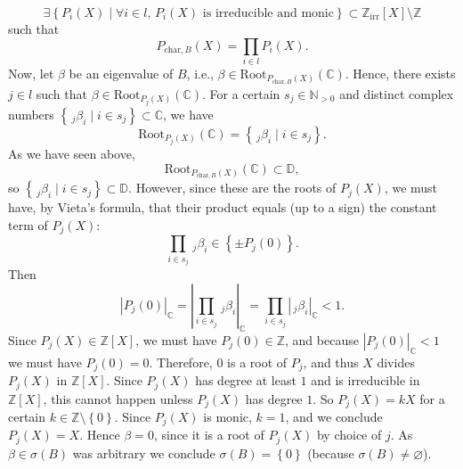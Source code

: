 \begin{solution}
    \[
        \exists \left\{P_i\left(X\right) \mid \forall i \in l,\, P_i\left(X\right) \text{ is irreducible and monic} \right\} \subset \mathbb{Z}_{\text{irr}}\left[X\right] \setminus \mathbb{Z}
    \]
    such that
    \[
        P_{\text{char},B}\left(X\right) = \prod_{i \in l} P_i\left(X\right).
    \]
    Now, let \( \beta \) be an eigenvalue of \( B \), i.e., \( \beta \in \mathrm{Root}_{P_{\text{char},B}\left(X\right)}\left(\mathbb{C}\right) \). Hence, there exists \( j \in l \) such that \( \beta \in \mathrm{Root}_{P_j\left(X\right)}\left(\mathbb{C}\right) \). For a certain \( s_j \in \mathbb{N}_{>0} \) and distinct complex numbers \( \left\{\,_{j}\beta_i \mid i \in s_j \right\} \subset \mathbb{C} \), we have
    \[
        \mathrm{Root}_{P_j\left(X\right)}\left(\mathbb{C}\right) = \left\{\,_{j}\beta_i \mid i \in s_j \right\}.
    \]
    As we have seen above,
    \[
        \mathrm{Root}_{P_{\text{char},B}\left(X\right)}\left(\mathbb{C}\right) \subset \mathbb{D},
    \]
    so \( \left\{\,_{j}\beta_i \mid i \in s_j \right\} \subset \mathbb{D} \). However, since these are the roots of \( P_j\left(X\right) \), we must have, by Vieta's formula, that their product equals (up to a sign) the constant term of \( P_j\left(X\right) \):
    \[
        \prod_{i\in s_j} \,_{j}\beta_i \in\left\{\pm P_j\left(0\right)\right\}.
    \]
    Then
    \[
        \left|P_j\left(0\right)\right|_{\mathbb{C}} = \left| \prod_{i\in s_j} \,_{j}\beta_i \right|_{\mathbb{C}} = \prod_{i\in s_j} \left| \,_{j}\beta_i \right|_{\mathbb{C}} < 1.
    \]
    Since \( P_{j}\left(X\right) \in \mathbb{Z}\left[X\right] \), we must have \( P_j\left(0\right) \in \mathbb{Z} \), and because \( \left|P_j\left(0\right)\right|_{\mathbb{C}} < 1 \) we must have \( P_j\left(0\right) = 0 \). Therefore, \( 0 \) is a root of \( P_j \), and thus \( X \) divides \( P_j\left(X\right) \) in \( \mathbb{Z}\left[X\right] \). Since \( P_j\left(X\right) \) has degree at least \( 1 \) and is irreducible in \( \mathbb{Z}\left[X\right] \), this cannot happen unless \( P_j\left(X\right) \) has degree \( 1 \). So \( P_j\left(X\right) = kX \) for a certain \( k \in \mathbb{Z} \setminus \left\{0\right\} \). Since \( P_j\left(X\right) \) is monic, \( k = 1 \), and we conclude \( P_j\left(X\right) = X \). Hence \( \beta = 0 \), since it is a root of \( P_j\left(X\right) \) by choice of \( j \). As \( \beta\in\sigma\left(B\right) \) was arbitrary we conclude \( \sigma\left(B\right)=\left\{0\right\} \) (because \( \sigma\left(B\right)\neq\varnothing \)).
    \\\\

\end{solution}
